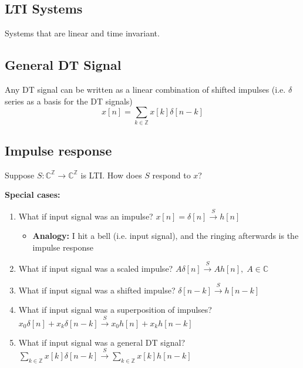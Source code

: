 \subsection{LTI Systems}
\begin{definition}
    Systems that are linear and time invariant.
\end{definition}

\subsection{General DT Signal}
\begin{definition}
    Any DT signal can be written as a linear combination of shifted impulses (i.e. $\delta$ series as a basis for the DT signals)
    \begin{equation}
        x[n] = \sum_{k \in \mathbb{Z}} x[k] \delta[n - k]
    \end{equation}
\end{definition}

\subsection{Impulse response}
\begin{intuition}
    Suppose \( S: \mathbb{C}^\mathbb{Z} \to \mathbb{C}^\mathbb{Z} \) is LTI. How does \( S \) respond to \( x \)?

    \textbf{Special cases:}
    \begin{enumerate}
        \item What if input signal was an impulse? $x[n]=\delta[n] \overset{S} \rightarrow h[n]$
        \begin{itemize}
            \item \textbf{Analogy:} I hit a bell (i.e. input signal), and the ringing afterwards is the impulse response
        \end{itemize}
        \item What if input signal was a scaled impulse? $A\delta[n] \overset{S} \rightarrow Ah[n], \; A\in \mathbb{C}$
        \item What if input signal was a shifted impulse? $\delta[n-k] \overset{S} \rightarrow h[n-k]$
        \item What if input signal was a superposition of impulses? $x_0 \delta[n] + x_k \delta[n-k] \overset{S} \rightarrow x_0 h[n] + x_k h[n-k]$
        \item What if input signal was a general DT signal? $\sum_{k \in \mathbb{Z}} x[k] \delta[n-k] \overset{S} \rightarrow \sum_{k \in \mathbb{Z}} x[k] h[n-k]$ 
    \end{enumerate}
\end{intuition}


